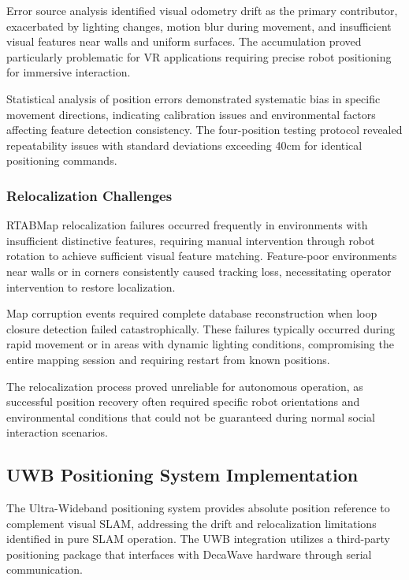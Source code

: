 Error source analysis identified visual odometry drift as the primary contributor, exacerbated by lighting changes, motion blur during movement, and insufficient visual features near walls and uniform surfaces. The accumulation proved particularly problematic for VR applications requiring precise robot positioning for immersive interaction.

Statistical analysis of position errors demonstrated systematic bias in specific movement directions, indicating calibration issues and environmental factors affecting feature detection consistency. The four-position testing protocol revealed repeatability issues with standard deviations exceeding 40cm for identical positioning commands.

\subsubsection{Relocalization Challenges}

RTABMap relocalization failures occurred frequently in environments with insufficient distinctive features, requiring manual intervention through robot rotation to achieve sufficient visual feature matching. Feature-poor environments near walls or in corners consistently caused tracking loss, necessitating operator intervention to restore localization.

Map corruption events required complete database reconstruction when loop closure detection failed catastrophically. These failures typically occurred during rapid movement or in areas with dynamic lighting conditions, compromising the entire mapping session and requiring restart from known positions.

The relocalization process proved unreliable for autonomous operation, as successful position recovery often required specific robot orientations and environmental conditions that could not be guaranteed during normal social interaction scenarios.

\subsection{UWB Positioning System Implementation}

The Ultra-Wideband positioning system provides absolute position reference to complement visual SLAM, addressing the drift and relocalization limitations identified in pure SLAM operation. The UWB integration utilizes a third-party positioning package that interfaces with DecaWave hardware through serial communication.

